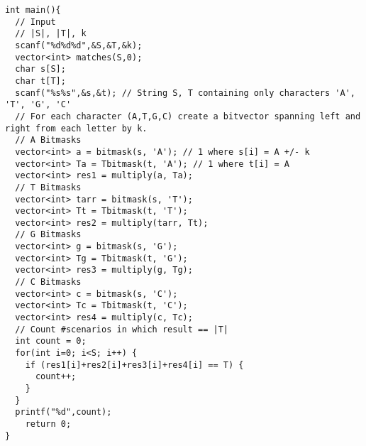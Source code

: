 \documentclass{article}
\begin{document}
\begin{lstlisting}
int main(){
  // Input
  // |S|, |T|, k
  scanf("%d%d%d",&S,&T,&k);
  vector<int> matches(S,0);
  char s[S];
  char t[T];
  scanf("%s%s",&s,&t); // String S, T containing only characters 'A', 'T', 'G', 'C'
  // For each character (A,T,G,C) create a bitvector spanning left and right from each letter by k.
  // A Bitmasks
  vector<int> a = bitmask(s, 'A'); // 1 where s[i] = A +/- k
  vector<int> Ta = Tbitmask(t, 'A'); // 1 where t[i] = A
  vector<int> res1 = multiply(a, Ta);
  // T Bitmasks
  vector<int> tarr = bitmask(s, 'T');
  vector<int> Tt = Tbitmask(t, 'T');
  vector<int> res2 = multiply(tarr, Tt);
  // G Bitmasks
  vector<int> g = bitmask(s, 'G');
  vector<int> Tg = Tbitmask(t, 'G');
  vector<int> res3 = multiply(g, Tg);
  // C Bitmasks
  vector<int> c = bitmask(s, 'C');
  vector<int> Tc = Tbitmask(t, 'C');
  vector<int> res4 = multiply(c, Tc);
  // Count #scenarios in which result == |T|
  int count = 0;
  for(int i=0; i<S; i++) {
    if (res1[i]+res2[i]+res3[i]+res4[i] == T) {
      count++;
    }
  }
  printf("%d",count);
    return 0;
}
\end{lstlisting}
\end{document}
